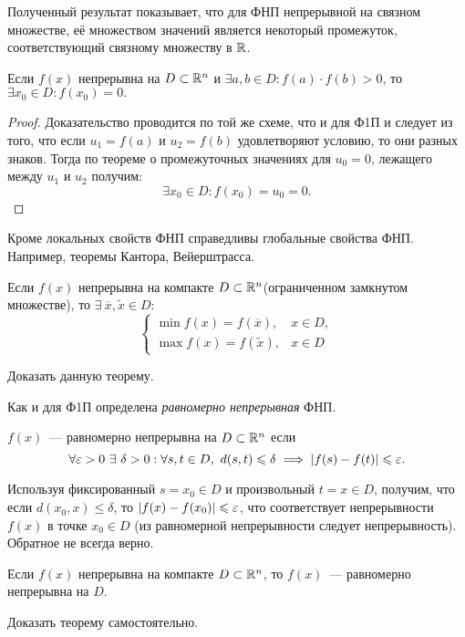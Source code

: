 \documentclass[../../main.tex]{subfiles}
\begin{document}
	\begin{rem}
		Полученный результат показывает, что для ФНП непрерывной на связном
		множестве, её множеством значений является некоторый промежуток,
		соответствующий связному множеству в $\mathbb{R}$.
	\end{rem}
	
    \begin{crl*}
			Если $f(x)$ непрерывна на $D \subset \mathbb{R}^n$ и $\exists a,b \in D: 
			f(a) \cdot f(b) > 0$, то $\exists x_0 \in D : f(x_0) = 0.$
	\end{crl*}
	
    \begin{proof}
    	Доказательство проводится по той же схеме, что и для Ф1П и следует из 
    	того, что если $u_1 = f(a)$ и $u_2 = f(b)$ удовлетворяют условию, то 
    	они разных знаков. Тогда по теореме о промежуточных значениях для 
    	$u_0 = 0$, лежащего между $u_1$ и $u_2$ получим:
    	\[\exists x_0 \in D: f(x_0) = u_0 = 0.\] 
    \end{proof}
	
	Кроме локальных свойств ФНП справедливы глобальные свойства ФНП. Например,
	теоремы Кантора, Вейерштрасса.
	\begin{thm}[Вейерштрасс]
		Если $f(x)$ непрерывна на компакте $D \subset \mathbb{R}^n$(ограниченном 
		замкнутом множестве), то $\exists\ \overline{x}, \widetilde{x} \in D:$
		\[ 
		\begin{cases}
		\min f(x) = f(\overline{x}),& x \in D, \\
		\max f(x) = f(\widetilde{x}),& x \in D
		\end{cases}
		\]
	\end{thm}
	\begin{exc}
		Доказать данную теорему.
	\end{exc}
	
	Как и для Ф1П определена \emph{равномерно непрерывная} ФНП.
	\begin{defn}
		$f(x)$~--- равномерно непрерывна на $D \subset \mathbb{R}^n$ если 
		\[
			\forall \eps > 0 \ \exists \ \delta > 0 : \forall s, t \in D,\ 
			d(s, t) \leq \delta \implies |f(s) - f(t)| \leq \eps.
		\]
	\end{defn}
	
	Используя фиксированный $s = x_0 \in D$ и произвольный $t = x \in D$, 
	получим, что если $d(x_0, x) \leq \delta$, то $|f(x) - f(x_0)| \leqslant \varepsilon$,
	что соответствует непрерывности $f(x)$ в точке $x_0 \in D$ (из равномерной 
	непрерывности следует непрерывность). Обратное не всегда верно.
	
	\begin{thm}[Кантор]
		Если $f(x)$ непрерывна на компакте $D \subset \mathbb{R}^n$, то $f(x)$~---
		равномерно непрерывна на $D$.
	\end{thm} 
	
	\begin{exc}
		Доказать теорему самостоятельно.
	\end{exc}
\end{document}
